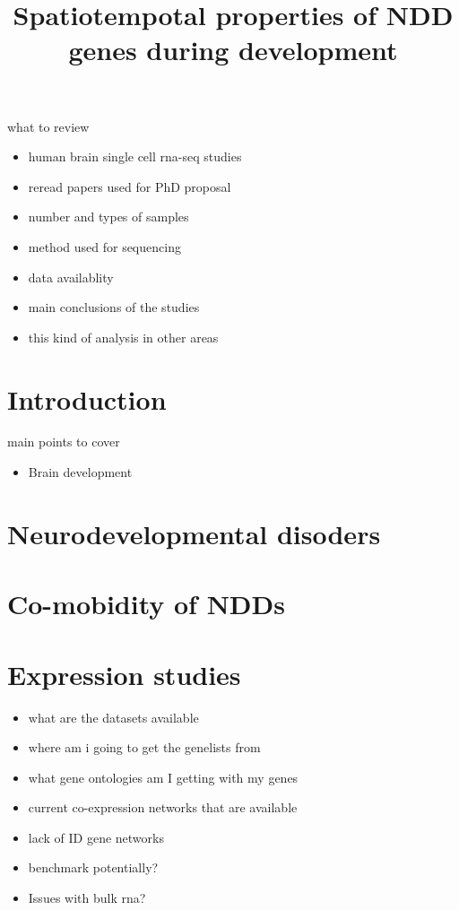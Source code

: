 \documentclass[12pt]{article}
\begin{document}
\title{Spatiotempotal properties of NDD genes during development}
\maketitle



what to review

\begin{itemize}
    \item human brain single cell rna-seq studies 
    \item reread papers used for PhD proposal 
    \item number and types of samples 
    \item method used for sequencing 
    \item data availablity 
    \item main conclusions of the studies
    \item this kind of analysis in other areas
\end{itemize}


\section{Introduction}

main points to cover 
\begin{itemize}
    \item Brain development 
\end{itemize}


\section{Neurodevelopmental disoders}
\section{Co-mobidity of NDDs}
\section{Expression studies}
\begin{itemize}

 \item what are the datasets available 
\item where am i going to get the genelists from 
\item what gene ontologies am I getting with my genes 
\item current co-expression networks that are available
\item lack of ID gene networks 
\item benchmark potentially?
\item Issues with bulk rna? 

\end{itemize}
\end{document}
